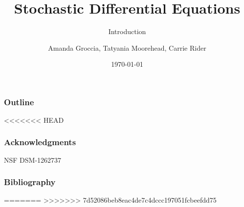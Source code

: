 \documentclass{beamer} %
\begin{document}
\author{Amanda Groccia, Tatyania Moorehead, Carrie Rider}



\title{Stochastic Differential Equations}
\subtitle{Introduction}
\date{\today}

\begin{frame}
  \titlepage
\end{frame}


\begin{frame}
  \frametitle{Outline}
  \tableofcontents[hideallsubsections]
\end{frame}














<<<<<<< HEAD



\begin{frame}
  \frametitle{Acknowledgments}

  NSF DSM-1262737

  

\end{frame}

\begin{frame}
  \frametitle{Bibliography}

  
  
  
\end{frame}

=======
>>>>>>> 7d52086beb8eac4de7c4dccc197051fcbeefdd75
\end{document}
